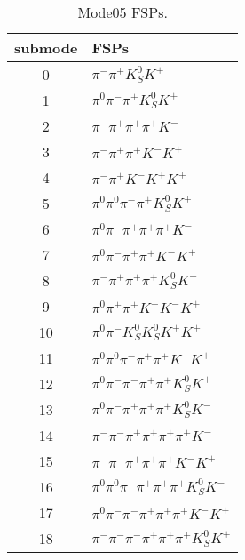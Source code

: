 \begin{table}[h!]
\begin{center}
\begin{tabular}{cl}
\hline
submode& FSPs\\
\hline
0 & $\pi^- \pi^+ K_S^0 K^+ $ \\
1 & $\pi^0 \pi^- \pi^+ K_S^0 K^+ $ \\
2 & $\pi^- \pi^+ \pi^+ \pi^+ K^- $ \\
3 & $\pi^- \pi^+ \pi^+ K^- K^+ $ \\
4 & $\pi^- \pi^+ K^- K^+ K^+ $ \\
5 & $\pi^0 \pi^0 \pi^- \pi^+ K_S^0 K^+ $ \\
6 & $\pi^0 \pi^- \pi^+ \pi^+ \pi^+ K^- $ \\
7 & $\pi^0 \pi^- \pi^+ \pi^+ K^- K^+ $ \\
8 & $\pi^- \pi^+ \pi^+ \pi^+ K_S^0 K^- $ \\
9 & $\pi^0 \pi^+ \pi^+ K^- K^- K^+ $ \\
10 & $\pi^0 \pi^- K_S^0 K_S^0 K^+ K^+ $ \\
11 & $\pi^0 \pi^0 \pi^- \pi^+ \pi^+ K^- K^+ $ \\
12 & $\pi^0 \pi^- \pi^- \pi^+ \pi^+ K_S^0 K^+ $ \\
13 & $\pi^0 \pi^- \pi^+ \pi^+ \pi^+ K_S^0 K^- $ \\
14 & $\pi^- \pi^- \pi^+ \pi^+ \pi^+ \pi^+ K^- $ \\
15 & $\pi^- \pi^- \pi^+ \pi^+ \pi^+ K^- K^+ $ \\
16 & $\pi^0 \pi^0 \pi^- \pi^+ \pi^+ \pi^+ K_S^0 K^- $ \\
17 & $\pi^0 \pi^- \pi^- \pi^+ \pi^+ \pi^+ K^- K^+ $ \\
18 & $\pi^- \pi^- \pi^- \pi^+ \pi^+ \pi^+ K_S^0 K^+ $ \\
\hline
\end{tabular}
\label{tab:Mode05FSPs}
\caption{Mode05 FSPs.}
\end{center}
\end{table}
